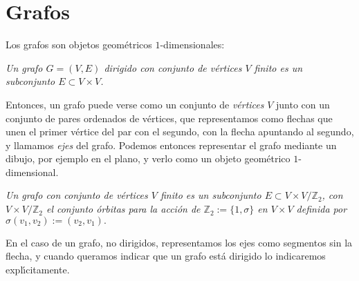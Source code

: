 \section{Grafos}
Los grafos son objetos geom\'etricos $1$-dimensionales:


{\itshape Un grafo $G=(V,E)$ dirigido con conjunto de v\'ertices $V$ finito es 
un subconjunto $E\subset 
V\times V$.  }



Entonces, un grafo puede verse como un conjunto de {\itshape v\'ertices} $V$ 
junto con un conjunto de pares ordenados de v\'ertices, que representamos como 
flechas 
que unen el primer v\'ertice  del par con el segundo, con la flecha apuntando 
al segundo, y llamamos {\itshape ejes} del grafo. Podemos 
entonces representar el grafo mediante un dibujo, por ejemplo en el plano, y 
verlo como un objeto geom\'etrico $1$-dimensional. 

{\itshape Un grafo con conjunto de v\'ertices $V$ finito es un subconjunto 
$E\subset V\times V/\mathbb{Z}_2$, con $V\times V/\mathbb{Z}_2$ el conjunto 
\'orbitas para la acci\'on de $\mathbb{Z}_2:=\{1,\sigma\}$ en $V\times V$ 
definida por $\sigma(v_1,v_2):=(v_2,v_1).$}

En el caso de un grafo, no dirigidos, representamos los ejes como segmentos sin 
la flecha, y cuando queramos indicar que un grafo est\'a dirigido lo 
indicaremos expl\'{\i}citamente. 

